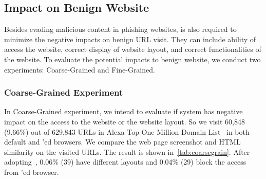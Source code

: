 \subsection{Impact on Benign Website}

Besides evading malicious content in phishing websites, \spartacus is also required to minimize the negative impacts on benign URL visit.
They can include ability of access the website, correct display of website layout, and correct functionalities of the website.
To evaluate the potential impacts to benign website, we conduct two experiments: Coarse-Grained and Fine-Grained.

\subsubsection{Coarse-Grained Experiment}

\coarsegrain

In Coarse-Grained experiment, we intend to evaluate if \spartacus system has negative impact on the access to the website or the website layout.
So we visit 60,848 (9.66\%) out of 629,843 URLs in Alexa Top One Million Domain List~\cite{AlexaTop1M} in both default and \spartacus'ed browsers.
We compare the web page screenshot and HTML similarity on the visited URLs.
The result is shown in~\autoref{tab:coarsegrain}.
After adopting~,
0.06\% (39) have different layouts and 
0.04\% (29) block the access from \spartacus'ed browser.

